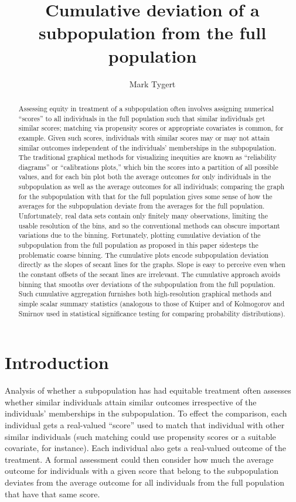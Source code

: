 \documentclass{article}
\title{Cumulative deviation of a subpopulation from the full population}
\author{Mark Tygert}
\begin{document}
\maketitle



\begin{abstract}
Assessing equity in treatment of a subpopulation often involves assigning
numerical ``scores'' to all individuals in the full population such that
similar individuals get similar scores; matching via propensity scores
or appropriate covariates is common, for example. Given such scores,
individuals with similar scores may or may not attain similar outcomes
independent of the individuals' memberships in the subpopulation.
The traditional graphical methods for visualizing inequities are known as
``reliability diagrams'' or ``calibrations plots,'' which bin the scores
into a partition of all possible values, and for each bin plot
both the average outcomes for only individuals in the subpopulation
as well as the average outcomes for all individuals; comparing the graph
for the subpopulation with that for the full population gives some sense
of how the averages for the subpopulation deviate from the averages
for the full population. Unfortunately, real data sets contain
only finitely many observations, limiting the usable resolution of the bins,
and so the conventional methods can obscure important variations
due to the binning. Fortunately, plotting cumulative deviation
of the subpopulation from the full population as proposed in this paper
sidesteps the problematic coarse binning.
The cumulative plots encode subpopulation deviation directly
as the slopes of secant lines for the graphs.
Slope is easy to perceive even when the constant offsets of the secant lines
are irrelevant. The cumulative approach avoids binning that smooths over
deviations of the subpopulation from the full population.
Such cumulative aggregation furnishes both high-resolution graphical methods
and simple scalar summary statistics (analogous to those
of Kuiper and of Kolmogorov and Smirnov used
in statistical significance testing for comparing probability distributions).
\end{abstract}



\section{Introduction}
\label{intro}

Analysis of whether a subpopulation has had equitable treatment
often assesses whether similar individuals attain similar outcomes
irrespective of the individuals' memberships in the subpopulation.
To effect the comparison, each individual gets a real-valued ``score''
used to match that individual with other similar individuals
(such matching could use propensity scores or a suitable covariate,
for instance).
Each individual also gets a real-valued outcome of the treatment.
A formal assessment could then consider how much the average outcome
for individuals with a given score that belong to the subpopulation
deviates from the average outcome for all individuals from the full population
that have that same score.
\end{document}
